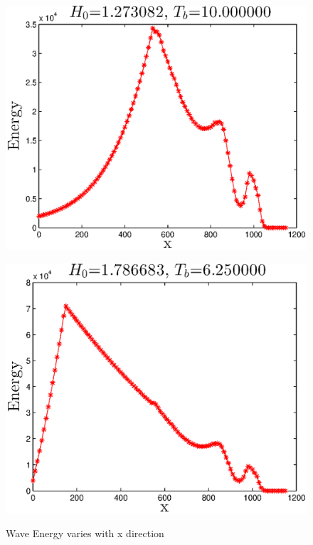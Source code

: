 
\begin{figure}[h]
\begin{minipage}[b]{0.47\linewidth}
\centering
\includegraphics[width=\textwidth]{forward_plot/p1_3.eps}
\label{Figenergy_1}
\end{minipage}
\hspace{0.2cm}
\begin{minipage}[b]{0.47\linewidth}
\centering
\includegraphics[width=\textwidth]{forward_plot/p2_3.eps}
\label{Figenergy_2}
\end{minipage}
\caption{Wave Energy varies with x direction}
\end{figure}

